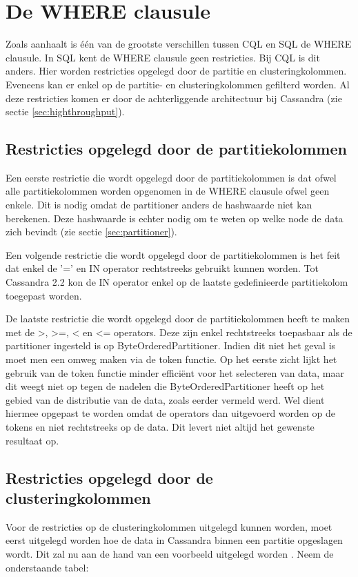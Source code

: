 \section{De WHERE clausule}
Zoals \cite{Lerer2015Where} aanhaalt is één van de grootste verschillen tussen CQL en SQL de WHERE clausule.
In SQL kent de WHERE clausule geen restricties.
Bij CQL is dit anders.
Hier worden restricties opgelegd door de partitie en clusteringkolommen.
Eveneens kan er enkel op de partitie- en clusteringkolommen gefilterd worden.
Al deze restricties komen er door de achterliggende architectuur bij Cassandra (zie sectie \ref{sec:highthroughput}).

\subsection{Restricties opgelegd door de partitiekolommen}

Een eerste restrictie die wordt opgelegd door de partitiekolommen is dat ofwel alle partitiekolommen worden opgenomen in de WHERE clausule ofwel geen enkele.
Dit is nodig omdat de partitioner anders de hashwaarde niet kan berekenen.
Deze hashwaarde is echter nodig om te weten op welke node de data zich bevindt (zie sectie \ref{sec:partitioner}).

Een volgende restrictie die wordt opgelegd door de partitiekolommen is het feit dat enkel de '=' en IN operator rechtstreeks gebruikt kunnen worden.
Tot Cassandra 2.2 kon de IN operator enkel op de laatste gedefinieerde partitiekolom toegepast worden.

De laatste restrictie die wordt opgelegd door de partitiekolommen heeft te maken met de >, >=, < en <= operators.
Deze zijn enkel rechtstreeks toepasbaar als de partitioner ingesteld is op ByteOrderedPartitioner.
Indien dit niet het geval is moet men een omweg maken via de token functie.
Op het eerste zicht lijkt het gebruik van de token functie minder efficiënt voor het selecteren van data, maar dit weegt niet op tegen de nadelen die ByteOrderedPartitioner heeft op het gebied van de distributie van de data, zoals eerder vermeld werd.
Wel dient hiermee opgepast te worden omdat de operators dan uitgevoerd worden op de tokens en niet rechtstreeks op de data.
Dit levert niet altijd het gewenste resultaat op.

\subsection{Restricties opgelegd door de clusteringkolommen}
Voor de restricties op de clusteringkolommen uitgelegd kunnen worden, moet eerst uitgelegd worden hoe de data in Cassandra binnen een partitie opgeslagen wordt.
Dit zal nu aan de hand van een voorbeeld uitgelegd worden \citep{Lerer2015Where}.
Neem de onderstaande tabel:

